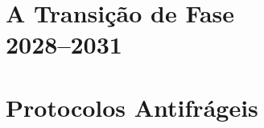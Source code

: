 \documentclass[12pt, twoside]{book}
\theoremstyle{plain}
\theoremstyle{definition}
\theoremstyle{remark}
\begin{document}
\part[A Transi\c{c}\~{a}o de Fase 2028--2031]{A Transi\c{c}\~{a}o de Fase\\2028--2031}




\part{Protocolos Antifr\'{a}geis}




\appendix





\end{document}
